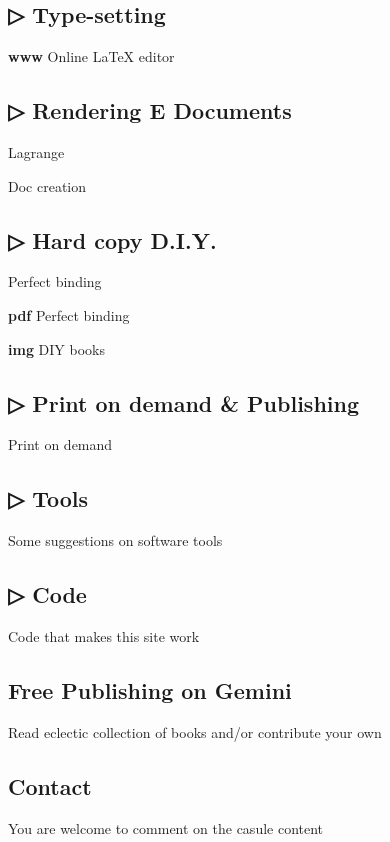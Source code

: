 \documentclass[
]{article}
\begin{document}
\subsection{▷ Type-setting}

\textbf{www} Online LaTeX editor

\subsection{▷ Rendering E Documents}

Lagrange

Doc creation

\subsection{▷ Hard copy D.I.Y.}

Perfect binding

\textbf{pdf} Perfect binding

\textbf{img} DIY books

\subsection{▷ Print on demand \& Publishing}

Print on demand

\subsection{▷ Tools}

Some suggestions on software tools

\subsection{▷ Code}

Code that makes this site work

\subsection{Free Publishing on Gemini}

Read eclectic collection of books and/or contribute your own

\subsection{Contact}

You are welcome to comment on the casule content
\end{document}
